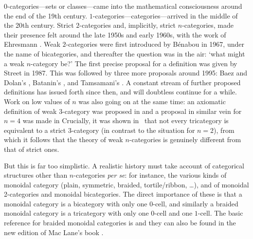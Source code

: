 \begin{sloppypar}
$0$-categories---sets or classes---came into the mathematical consciousness
around the end of the 19th century.  $1$-categories---categories---arrived in
the middle of the 20th century.  Strict $2$-categories and, implicitly,
strict $n$-categories, made their presence felt around the late 1950s and
early 1960s, with the work of Ehresmann .  Weak $2$-categories were
first introduced by B\'enabou  in 1967, under the name of
bicategories, and thereafter the question was in the air: `what might a weak
$n$-category be?'  The first precise proposal for a definition was given by
Street  in 1987.  This was followed by three more proposals
around 1995: Baez and Dolan's , Batanin's , and
Tamsamani's .  A constant stream of further proposed definitions
has issued forth since then, and will doubtless continue for a while.
Work on low values of $n$ was also going on at the same time: an
axiomatic definition of weak $3$-category was proposed in
% 
%
% 
and a proposal in similar vein for $n=4$ was made in
% 
%
% 
Crucially, it was shown in~ that not every tricategory is
equivalent to a strict $3$-category (in contrast to the situation for $n=2$),
from which it follows that the theory of weak $n$-categories is genuinely
different from that of strict ones. 
\end{sloppypar}

But this is far too simplistic.  A realistic history must take account of
categorical structures other than $n$-categories \emph{per se}: for instance,
the various kinds of monoidal category (plain, symmetric, braided,
tortile/ribbon, \ldots), and of monoidal 2-categories and monoidal
bicategories.  The direct importance of these is that a monoidal category is
a bicategory with only one $0$-cell, and similarly a braided monoidal
category is a tricategory with only one $0$-cell and one $1$-cell.  The basic
reference for braided monoidal categories is
% 
%
% 
and they can also be found in the new edition of Mac Lane's book
.

